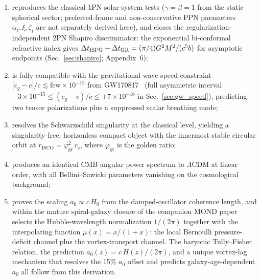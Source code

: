 \documentclass[aps,prd,onecolumn,superscriptaddress,nofootinbib,showpacs,12pt]{revtex4-2}
\newcommand{\rs}{r_{\mathrm{s}}}
\newcommand{\azero}{a_{0}}
\newcommand{\phigr}{\varphi_{\mathrm{gr}}}
\begin{document}
\begin{enumerate}
\item reproduces the classical 1PN solar-system tests
  ($\gamma = \beta = 1$ from the static spherical sector;
  preferred-frame and non-conservative PPN parameters
  $\alpha_i,\xi,\zeta_i$ are not separately derived here),
  and closes the regularization-independent 2PN Shapiro
  discriminator: the exponential bi-conformal refractive
  index gives
  $\Delta t_{\rm ISPG}-\Delta t_{\rm GR}
  =(\pi/4)G^2M^2/(c^5 b)$ for asymptotic endpoints
  (Sec.~\ref{sec:shapiro}; Appendix~6);
\item is fully compatible with the gravitational-wave speed
  constraint $|c_{g} - c|/c \lesssim \text{few}\times 10^{-15}$
  from GW170817~\cite{LIGO_GW170817} (full asymmetric interval
  $-3\times 10^{-15} \leq (c_g-c)/c \leq +7\times 10^{-16}$ in
  Sec.~\ref{sec:gw_speed}), predicting two tensor
  polarizations plus a suppressed scalar breathing mode;
\item resolves the Schwarzschild singularity at the classical
  level, yielding a singularity-free, horizonless compact
  object with the innermost stable circular orbit at
  $r_{\mathrm{ISCO}} = \phigr^{2}\,\rs$, where $\phigr$ is
  the golden ratio;
\item produces an identical CMB angular power spectrum to
  $\Lambda$CDM at linear order, with all Bellini--Sawicki
  parameters vanishing on the cosmological background;
\item proves the scaling $\azero \propto c\,H_{0}$ from
  the damped-oscillator coherence length, and within the
  mature spiral-galaxy closure of the companion MOND
  paper~\cite{Lotishvili2026MOND} selects the
  Hubble-wavelength normalization $1/(2\pi)$ together with the
  interpolating function $\mu(x) = x/(1+x)$:
  the local Bernoulli pressure-deficit channel plus the
  vortex-transport channel.  The baryonic
  Tully--Fisher relation, the prediction
  $\azero(z) = c\,H(z)/(2\pi)$, and a unique
  vortex-lag mechanism that resolves the 15\%
  $\azero$ offset and predicts galaxy-age-dependent
  $\azero$ all follow from this derivation.
\end{enumerate}
\end{document}
